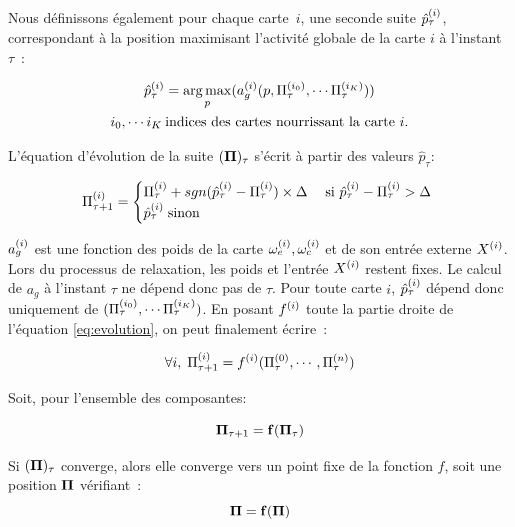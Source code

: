 \documentclass[../main]{subfiles}
\begin{document}
Nous définissons également pour chaque carte~$i$, une seconde suite $\hat{p}^{({i})}_\tau$, correspondant à la position maximisant l'activité globale de la carte $i$ à l'instant $\tau$~:

\begin{equation}
\begin{gathered}
\hat{p}^{({i})}_{\tau} = \operatorname*{arg\,max}_p(a_g^{({i})}(p,\Pi^{({i_0})}_\tau, \cdots \Pi^{({i_K})}_\tau))\\
 i_0, \cdots i_K \: \text{indices des cartes nourrissant la carte $i$}.
\end{gathered}
\label{eq:pstar}
\end{equation}

L'équation d'évolution de la suite $(\mathbf{\Pi})_\tau$ s'écrit à partir des valeurs $\hat{p}_\tau$:

\begin{equation}
\Pi^{({i})}_{\tau+1} = 
\begin{cases}
\Pi^{({i})}_{\tau} + sgn(\hat{p}^{({i})}_{\tau} - \Pi^{({i})}_{\tau}) \times \Delta \; & \text{si $\hat{p}^{({i})}_{\tau} - \Pi^{({i})}_{\tau} > \Delta$ } \\
\hat{p}^{({i})}_{\tau} \; \text{sinon}	
\end{cases}
\label{eq:evolution}
\end{equation}

$a_g^{({i})}$ est une fonction des poids de la carte $\omega_{e}^{({i})}, \omega_{c}^{({i})}$ et de son entrée externe $X^{({i})}$. 
Lors du processus de relaxation, les poids et l'entrée $X^{({i})}$ restent fixes. 
Le calcul de $a_g$ à l'instant $\tau$ ne dépend donc pas de $\tau$.
Pour toute carte $i$, $\hat{p}^{({i})}_{\tau}$ dépend donc uniquement de $(\Pi^{({i_0})}_\tau, \cdots \Pi^{({i_K})}_\tau)$. 
En posant $f^{({i})}$ toute la partie droite de l'équation \ref{eq:evolution}, on peut finalement écrire~:

\begin{equation}
\forall i, \; \Pi^{({i})}_{\tau +1} = f^{({i})}(\Pi^{({0})}_\tau,\cdots,\Pi^{({n})}_\tau)
\label{eq:fonction}
\end{equation}

Soit, pour l'ensemble des composantes: 

\begin{equation}
\mathbf{\Pi}_{\tau+1} = \mathbf{f}(\mathbf{\Pi}_\tau)
\end{equation}

Si $(\mathbf{\Pi})_\tau$ converge, alors elle converge vers un point fixe de la fonction $f$, soit une position $\mathbf{\Pi}$ vérifiant~:
\begin{equation}
\mathbf{\Pi} = \mathbf{f}(\mathbf{\Pi})
\label{eq:suite}
\end{equation}
\end{document}
